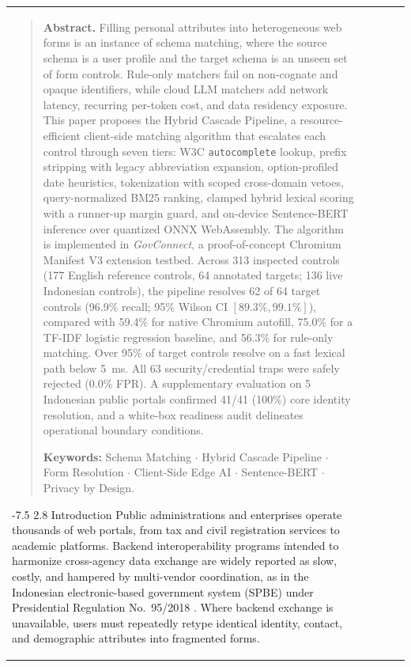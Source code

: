 \documentclass[runningheads,a4paper]{llncs}
\makeatletter
\renewcommand\section{\@startsection{section}{1}{\z@}%
  {-7.5\p@ \@plus -2\p@ \@minus -1\p@}%
  {2.8\p@ \@plus 1\p@}%
  {\normalfont\large\bfseries}}
\makeatother
\begin{document}
\begin{table}[t]
\begin{tabular}{p{3.2cm}cccc}
\vspace{2pt}
\begin{quote}
\small\normalfont
\noindent\textbf{Abstract.} Filling personal attributes into heterogeneous web forms is an instance of schema matching, where the source schema is a user profile and the target schema is an unseen set of form controls. Rule-only matchers fail on non-cognate and opaque identifiers, while cloud LLM matchers add network latency, recurring per-token cost, and data residency exposure. This paper proposes the Hybrid Cascade Pipeline, a resource-efficient client-side matching algorithm that escalates each control through seven tiers: W3C \texttt{autocomplete} lookup, prefix stripping with legacy abbreviation expansion, option-profiled date heuristics, tokenization with scoped cross-domain vetoes, query-normalized BM25 ranking, clamped hybrid lexical scoring with a runner-up margin guard, and on-device Sentence-BERT inference over quantized ONNX WebAssembly. The algorithm is implemented in \emph{GovConnect}, a proof-of-concept Chromium Manifest V3 extension testbed. Across 313 inspected controls (177 English reference controls, 64 annotated targets; 136 live Indonesian controls), the pipeline resolves 62 of 64 target controls (96.9\% recall; 95\% Wilson CI $[89.3\%, 99.1\%]$), compared with 59.4\% for native Chromium autofill, 75.0\% for a TF-IDF logistic regression baseline, and 56.3\% for rule-only matching. Over 95\% of target controls resolve on a fast lexical path below 5~ms. All 63 security/credential traps were safely rejected (0.0\% FPR). A supplementary evaluation on 5 Indonesian public portals confirmed 41/41 (100\%) core identity resolution, and a white-box readiness audit delineates operational boundary conditions.

\vspace{2pt}
\noindent\textbf{Keywords:} Schema Matching $\cdot$ Hybrid Cascade Pipeline $\cdot$ Form Resolution $\cdot$ Client-Side Edge AI $\cdot$ Sentence-BERT $\cdot$ Privacy by Design.
\end{quote}

\section{Introduction}
\noindent Public administrations and enterprises operate thousands of web portals, from tax and civil registration services to academic platforms. Backend interoperability programs intended to harmonize cross-agency data exchange are widely reported as slow, costly, and hampered by multi-vendor coordination, as in the Indonesian electronic-based government system (SPBE) under Presidential Regulation No.~95/2018 \cite{hermanto2022,spbe2018}. Where backend exchange is unavailable, users must repeatedly retype identical identity, contact, and demographic attributes into fragmented forms.


\end{tabular}
\end{table}
\end{document}

